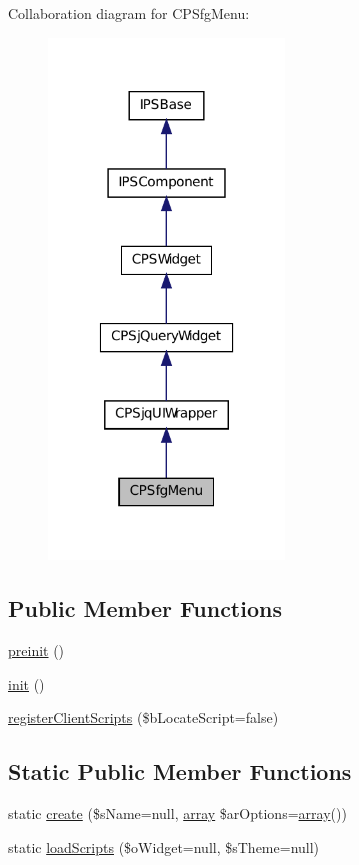 Collaboration diagram for CPSfgMenu:\nopagebreak
\begin{figure}[H]
\begin{center}
\leavevmode
\includegraphics[width=178pt]{classCPSfgMenu__coll__graph}
\end{center}
\end{figure}
\subsection*{Public Member Functions}
\begin{DoxyCompactItemize}
\item 
\hyperlink{classCPSfgMenu_a2dc262e99b1c246b56f27626bfe699ff}{preinit} ()
\item 
\hyperlink{classCPSfgMenu_a4be4055f3361d4800e16bc2e2e38cda6}{init} ()
\item 
\hyperlink{classCPSfgMenu_ac02a66bde8e72e4909137bf748edf665}{registerClientScripts} (\$bLocateScript=false)
\end{DoxyCompactItemize}
\subsection*{Static Public Member Functions}
\begin{DoxyCompactItemize}
\item 
static \hyperlink{classCPSfgMenu_a0ffc269a208148ade57c7eb608a4562a}{create} (\$sName=null, \hyperlink{list_8php_aa3205d038c7f8feb5c9f01ac4dfadc88}{array} \$arOptions=\hyperlink{list_8php_aa3205d038c7f8feb5c9f01ac4dfadc88}{array}())
\item 
static \hyperlink{classCPSfgMenu_a561cda05113b81fc962133829351f41e}{loadScripts} (\$oWidget=null, \$sTheme=null)
\end{DoxyCompactItemize}
